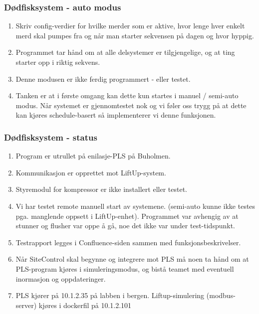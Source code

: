 \documentclass{beamer}
\begin{document}
    \begin{frame}
  \frametitle{Dødfisksystem - auto modus}
  \begin{enumerate}
    \vspace{0pt} %
    \item<1-> Skriv config-verdier for hvilke merder som er aktive, hvor lenge hver enkelt merd skal pumpes fra og når man starter sekvensen på dagen og hvor hyppig.
    \item<2-> Programmet tar hånd om at alle delsystemer er tilgjengelige, og at ting starter opp i riktig sekvens.
    \item<3-> Denne modusen er ikke ferdig programmert - eller testet.
    \item<4-> Tanken er at i første omgang kan dette kun startes i manuel / semi-auto modus. Når systemet er gjennomtestet nok og vi føler oss trygg på at dette kan kjøres schedule-basert så implementerer vi denne funksjonen.
    \end{enumerate}
\end{frame}

    \begin{frame}
  \frametitle{Dødfisksystem - status}
  \begin{enumerate}
    \vspace{0pt} %
    \item<1-> Program er utrullet på enilasje-PLS på Buholmen.
    \item<2-> Kommunikasjon er opprettet mot LiftUp-system.
    \item<3-> Styremodul for kompressor er ikke installert eller testet.
    \item<4-> Vi har testet remote manuell start av systemene. (semi-auto kunne ikke testes pga. manglende oppsett i LiftUp-enhet). Programmet var avhengig av at stunner og flusher var oppe å gå, noe det ikke var under test-tidspunkt.
    \item<5-> Testrapport legges i Confluence-siden sammen med funksjonsbeskrivelser.
    \item<6-> Når SiteControl skal begynne og integrere mot PLS må noen ta hånd om at PLS-program kjøres i simuleringsmodus, og bistå teamet med eventuell inormasjon og oppdateringer.
    \item<7-> PLS kjører på 10.1.2.35 på labben i bergen. Liftup-simulering (modbus-server) kjøres i dockerfil på 10.1.2.101
    \end{enumerate}
\end{frame}
\end{document}
